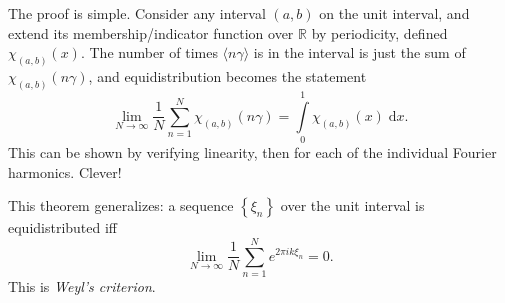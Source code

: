 \documentclass[11pt,
        usenames, %
        dvipsnames %
    ]{report}
\newcommand*{\ev}[1]{\langle#1\rangle}
\newcommand*{\z}[1]{\left\{#1\right\}}
\begin{document}
\begin{itemize}
        The proof is simple. Consider any interval $(a, b)$ on the unit
        interval, and extend its membership/indicator function over $\mathbb{R}$
        by periodicity, defined $\chi_{(a,b)}(x)$. The number of times
        $\ev{n\gamma}$ is in the interval is just the sum of
        $\chi_{(a,b)}(n\gamma)$, and equidistribution becomes the statement
        \begin{equation}
            \lim_{N \to \infty}
                \frac{1}{N}\sum\limits_{n = 1}^N \chi_{(a,b)}(n\gamma)
                = \int\limits_0^1 \chi_{(a,b)}(x)\;\mathrm{d}x.
        \end{equation}
        This can be shown by verifying linearity, then for each of the individual
        Fourier harmonics. Clever!

        This theorem generalizes: a sequence $\z{\xi_n}$ over the unit interval
        is equidistributed iff
        \begin{equation}
            \lim_{N \to \infty}
                \frac{1}{N}\sum\limits_{n = 1}^N e^{2\pi i k \xi_n} = 0.
        \end{equation}
        This is \emph{Weyl's criterion}.
\end{itemize}
\end{document}
